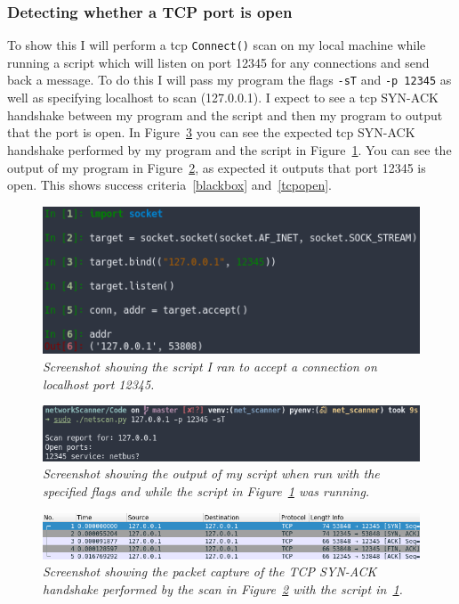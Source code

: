 \documentclass[titlepage]{article}
\let\Oldsubsubsection\subsubsection{}
\renewcommand{\subsubsection}{\FloatBarrier\Oldsubsubsection}
\begin{document}
\subsubsection{Detecting whether a TCP port is open}
To show this I will perform a \gls{tcp} \verb|Connect()| scan on my local
machine while running a script which will listen on port 12345 for any connections
and send back a message. To do this I will pass my program the flags \verb|-sT| and
\verb|-p 12345| as well as specifying localhost to scan (127.0.0.1).
I expect to see a \gls{tcp} SYN-ACK handshake between my program and the script and
then my program to output that the port is open. In Figure~\ref{tcpopenpcap} you can
see the expected \gls{tcp} SYN-ACK handshake performed by my program and the script
in Figure~\ref{tcpopenscript}.
You can see the output of my program in Figure~\ref{tcpopenoutput}, as expected
it outputs that port 12345 is open. This shows success criteria~\ref{blackbox}
and~\ref{tcpopen}.

\begin{figure}[H]
  \centering
  \includegraphics[width=\textwidth]{tcpopenscript.png}
  \caption{\textit{%
    Screenshot showing the script I ran to accept a connection on localhost port 12345.
}}\label{tcpopenscript}
\end{figure}

\begin{figure}[H]
  \centering
  \includegraphics[width=\textwidth]{tcpopenoutput.png}
  \caption{\textit{%
    Screenshot showing the output of my script when run with the specified flags
    and while the script in Figure~\ref{tcpopenscript} was running.
}}\label{tcpopenoutput}
\end{figure}

\begin{figure}[H]
  \centering
  \includegraphics[width=\textwidth]{tcpopenpcap.png}
  \caption{\textit{%
    Screenshot showing the packet capture of the TCP SYN-ACK handshake performed
    by the scan in Figure~\ref{tcpopenoutput} with the script in~\ref{tcpopenscript}.
}}\label{tcpopenpcap}
\end{figure}
\end{document}
